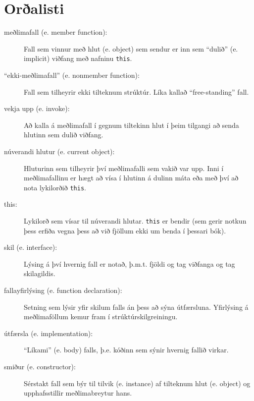 \section{Orðalisti}

\begin{description}

\item[meðlimafall (e. member function):]  Fall sem vinnur með hlut (e. object) sem sendur er inn sem ``dulið'' (e. implicit) viðfang með nafninu {\tt this}.

\item[``ekki-meðlimafall'' (e. nonmember function):]  Fall sem tilheyrir ekki tilteknum strúktúr. Líka kallað ``free-standing'' fall.

\item[vekja upp (e. invoke):] Að kalla á meðlimafall í gegnum tiltekinn hlut í þeim tilgangi að senda hlutinn sem dulið viðfang. 

\item[núverandi hlutur (e. current object):]  Hluturinn sem tilheyrir því meðlimafalli sem vakið var upp. 
Inni í meðlimafallinu er hægt að vísa í hlutinn á dulinn máta eða með því að nota lykilorðið {\tt this}.

\item[this:]  Lykilorð sem vísar til núverandi hlutar. 
{\tt this} er bendir (sem gerir notkun þess erfiða vegna þess að við fjöllum ekki um benda í þessari bók). 

\item[skil (e. interface):] Lýsing á því hvernig fall er notað, þ.m.t. fjöldi og tag viðfanga og tag skilagildis.

\item[fallayfirlýsing (e. function declaration):] Setning sem lýsir yfir skilum falls án þess að sýna útfærsluna. 
Yfirlýsing á meðlimaföllum kemur fram í strúktúrskilgreiningu.

\item[útfærsla (e. implementation):] ``Líkami'' (e. body) falls, þ.e. kóðinn sem sýnir hvernig fallið virkar. 

\item[smiður (e. constructor):] Sérstakt fall sem býr til tilvik (e. instance) af tilteknum hlut (e. object) og upphafsstillir meðlimabreytur hans. 


\end{description}

